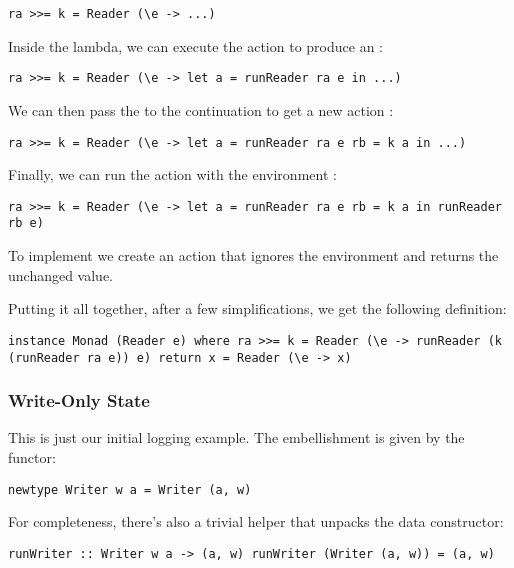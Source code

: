 \begin{verbatim}
ra >>= k = Reader (\e -> ...)
\end{verbatim}

Inside the lambda, we can execute the action  to produce an
:

\begin{verbatim}
ra >>= k = Reader (\e -> let a = runReader ra e in ...)
\end{verbatim}

We can then pass the  to the continuation  to get a
new action :

\begin{verbatim}
ra >>= k = Reader (\e -> let a = runReader ra e rb = k a in ...)
\end{verbatim}

Finally, we can run the action  with the environment
:

\begin{verbatim}
ra >>= k = Reader (\e -> let a = runReader ra e rb = k a in runReader rb e)
\end{verbatim}

To implement  we create an action that ignores the
environment and returns the unchanged value.

Putting it all together, after a few simplifications, we get the
following definition:

\begin{verbatim}
instance Monad (Reader e) where ra >>= k = Reader (\e -> runReader (k (runReader ra e)) e) return x = Reader (\e -> x)
\end{verbatim}

\subsubsection{Write-Only State}\label{write-only-state}

This is just our initial logging example. The embellishment is given by
the  functor:

\begin{verbatim}
newtype Writer w a = Writer (a, w)
\end{verbatim}

For completeness, there's also a trivial helper  that
unpacks the data constructor:

\begin{verbatim}
runWriter :: Writer w a -> (a, w) runWriter (Writer (a, w)) = (a, w)
\end{verbatim}

